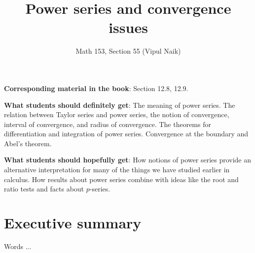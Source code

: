 \documentclass{amsart}
\title{Power series and convergence issues}
\author{Math 153, Section 55 (Vipul Naik)}
\begin{document}
\maketitle

{\bf Corresponding material in the book}: Section 12.8, 12.9.

{\bf What students should definitely get}: The meaning of power
series. The relation between Taylor series and power series, the
notion of convergence, interval of convergence, and radius of
convergence. The theorems for differentiation and integration of power
series. Convergence at the boundary and Abel's theorem.

{\bf What students should hopefully get}: How notions of power series
provide an alternative interpretation for many of the things we have
studied earlier in calculus. How results about power series combine
with ideas like the root and ratio tests and facts about $p$-series.

\section*{Executive summary}

Words ...
\end{document}
